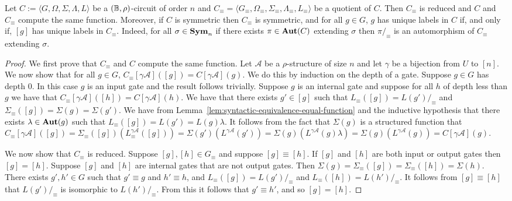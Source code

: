 \documentclass[../main/thesis.tex]{subfiles}
\begin{document}
\begin{lem}
  Let $C := \langle G, \Omega, \Sigma, \Lambda, L\rangle$ be a $(\mathbb{B},
  \rho)$-circuit of order $n$ and $C_{\equiv} = \langle G_\equiv ,
  \Omega_\equiv, \Sigma_\equiv , \Lambda_\equiv, L_\equiv \rangle$ be a quotient
  of $C$. Then $C_\equiv$ is reduced and $C$ and $C_{\equiv}$ compute the same
  function. Moreover, if $C$ is symmetric then $C_{\equiv}$ is symmetric, and
  for all $g \in G$, $g$ has unique labels in $C$ if, and only if, $[g]$ has
  unique labels in $C_{\equiv}$. Indeed, for all $\sigma \in \text{\textbf{Sym}}_n$ if there
  exists $\pi \in \text{\textbf{Aut}}(C)$ extending $\sigma$ then $\pi /_\equiv$ is an
  automorphism of $C_\equiv$ extending $\sigma$.
  \label{lem:quotient-circuits-preserve}
\end{lem}
\begin{proof}
  We first prove that $C_\equiv$ and $C$ compute the same function. Let
  $\mathcal{A}$ be a $\rho$-structure of size $n$ and let $\gamma$ be a
  bijection from $U$ to $[n]$. We now show that for all $g \in G$, $C_\equiv
  [\gamma \mathcal{A}]([g]) = C[\gamma \mathcal{A}](g)$. We do this by induction
  on the depth of a gate. Suppose $g \in G$ has depth $0$. In this case $g$ is
  an input gate and the result follows trivially. Suppose $g$ is an internal
  gate and suppose for all $h$ of depth less than $g$ we have that
  $C_\equiv[\gamma \mathcal{A}]([h]) = C[\gamma \mathcal{A}](h)$. We have that
  there exists $g' \in [g]$ such that $L_\equiv ([g]) = L(g') /_\equiv$ and
  $\Sigma_\equiv([g]) = \Sigma (g) = \Sigma (g')$. We have from
  Lemma~\ref{lem:syntactic-equivalence-equal-function} and the inductive
  hypothesis that there exists $\lambda \in \text{\textbf{Aut}}(g)$ such that $L_\equiv ([g]) =
  L(g') = L(g) \lambda$. It follows from the fact that $\Sigma(g)$ is a
  structured function that $C_\equiv[\gamma \mathcal{A}]([g]) = \Sigma_\equiv
  ([g])(L^{\gamma \mathcal{A}}_\equiv([g])) = \Sigma (g') (L^{\gamma
    \mathcal{A}}(g')) = \Sigma (g)(L^{\gamma \mathcal{A}}(g) \lambda) = \Sigma
  (g) (L^{\gamma \mathcal{A}}(g)) = C[\gamma \mathcal{A}](g)$.
  
  We now show that $C_\equiv$ is reduced. Suppose $[g], [h] \in G_\equiv$ and
  suppose $[g] \equiv [h]$. If $[g]$ and $[h]$ are both input or output gates
  then $[g] = [h]$. Suppose $[g]$ and $[h]$ are internal gates that are not
  output gates. Then $\Sigma (g) = \Sigma_\equiv ([g]) = \Sigma_\equiv([h]) =
  \Sigma(h)$. There exists $g', h' \in G$ such that $g' \equiv g$ and $h' \equiv
  h$, and $L_\equiv ([g]) = L(g') /_\equiv$ and $L_\equiv ([h]) = L(h')
  /_\equiv$. It follows from $[g] \equiv [h]$ that $L(g') /_\equiv$ is
  isomorphic to $L(h') /_\equiv$. From this it follows that $g' \equiv h'$, and
  so $[g] = [h]$.


\end{proof}
\end{document}
